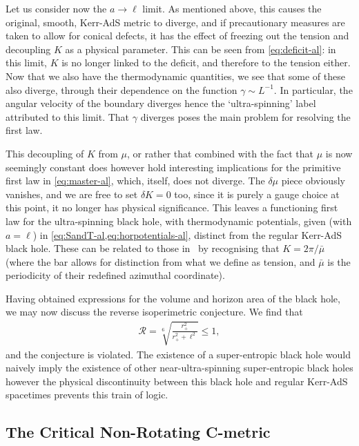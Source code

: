 \documentclass[
twoside,
openright,
frontopenright
]{dmathesis}
\newcommand{\todoopt}[2][]{\todo[color=blue!20,size=\footnotesize,#1]{#2}}
\begin{document}
Let us consider now the $a\to\ell$ limit. As mentioned above, this causes the
original, smooth, Kerr-AdS metric to diverge, and if precautionary measures are
taken to allow for conical defects, it has the effect of freezing out the
tension and decoupling $K$ as a physical parameter. This can be seen from
\cref{eq:deficit-al}: in this limit, $K$ is no longer linked to the deficit, and
therefore to the tension either. Now that we also have the thermodynamic
quantities, we see that some of these also diverge, through their dependence on
the function $\gamma\sim L^{-1}$. In particular, the angular velocity of the
boundary diverges hence the `ultra-spinning' label attributed to this
limit. That $\gamma$ diverges poses the main problem for resolving the first
law.

This decoupling of $K$ from $\mu$, or rather that combined with the fact that
$\mu$ is now seemingly constant does however hold interesting implications for
the primitive first law in \cref{eq:master-al}, which, itself, does not
diverge. The $\delta \mu$ piece obviously vanishes, and we are free to set
$\delta K=0$ too, since it is purely a gauge choice at this point, it no longer
has physical significance. This leaves a functioning first law for the
ultra-spinning black hole, with thermodynamic potentials, given (with $a=\ell$)
in \cref{eq:SandT-al,eq:horpotentials-al}, distinct from the regular Kerr-AdS
black hole. These can be related to those
in~\cite{Hennigar:2014cfa,Hennigar:2015cja} by recognising that
$K=2\pi/\bar{\mu}$ (where the bar allows for distinction from what we define as
tension, and $\bar{\mu}$ is the periodicity of their redefined azimuthal
coordinate).

Having obtained expressions for the volume and horizon area of the black hole,
we may now discuss the reverse isoperimetric conjecture. We find that
\begin{align} \mathcal{R} =
\sqrt[6~]{\frac{r_{+}^{2}}{r_{+}^{2}+\ell^{2}}}\leqslant 1,
\end{align} and the conjecture is violated. The existence of a super-entropic
black hole would naively imply the existence of other near-ultra-spinning
super-entropic black holes however the physical discontinuity between this black
hole and regular Kerr-AdS spacetimes prevents this train of
logic. \todoopt{Implications for conjecture validity?} 

\subsection{The Critical Non-Rotating C-metric}
\label{sec:critnrC}
\end{document}
